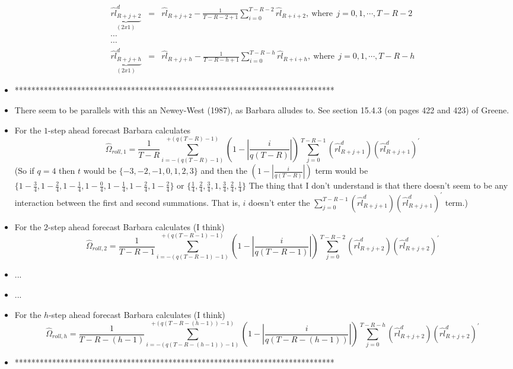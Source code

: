 \documentclass[11pt]{article}
\begin{document}
\begin{itemize}
\begin{eqnarray}
\underbrace{\widehat{rl}^{d}_{R+j+2}}_{(2x1)}\!\!\!\!&=&\!\!\!\!\widehat{rl}_{R+j+2}-\frac{1}{T-R-2+1}\sum_{i=0}^{T-R-2}\widehat{rl}_{R+i+2}, \ \textrm{where} \ \ j=0, 1, \cdots, T-R-2\nonumber \\
\cdots
\nonumber \\
\cdots
\nonumber \\
\underbrace{\widehat{rl}^{d}_{R+j+h}}_{(2x1)}\!\!\!\!&=&\!\!\!\!\widehat{rl}_{R+j+h}-\frac{1}{T-R-h+1}\sum_{i=0}^{T-R-h}\widehat{rl}_{R+i+h}, \ \textrm{where} \ \ j=0, 1, \cdots, T-R-h
\nonumber
\end{eqnarray}
\item *****************************************************************************
\item There seem to be parallels with this an Newey-West (1987), as Barbara alludes to.  See section 15.4.3 (on pages 422 and 423) of Greene. 
\item For the $1$-step ahead forecast Barbara calculates
\[ \widehat{\Omega}_{roll,1}=\frac{1}{T-R}\sum_{i=-(q(T-R)-1)}^{+(q(T-R)-1)}\left(1-\left|\frac{i}{q(T-R)}\right|\right)\sum_{j=0}^{T-R-1}(\widehat{rl}^{d}_{R+j+1})(\widehat{rl}^{d}_{R+j+1})^{\prime}
\]
(So if $q=4$ then $t$ would be $\{-3,-2,-1,0,1,2,3\}$ and then the $\left(1-\left|\frac{i}{q(T-R)}\right|\right)$ term would be $\{1-\frac{3}{4},1-\frac{2}{4},1-\frac{1}{4},1-\frac{0}{4},1-\frac{1}{4},1-\frac{2}{4},1-\frac{2}{4}\}$ or $\{\frac{1}{4},\frac{2}{4},\frac{3}{4},1,\frac{3}{4},\frac{2}{4},\frac{1}{4}\}$  The thing that I don't understand is that there doesn't seem to be any interaction between the first and second summations.  That is, $i$ doesn't enter the $\sum_{j=0}^{T-R-1}(\widehat{rl}^{d}_{R+j+1})(\widehat{rl}^{d}_{R+j+1})^{\prime}$ term.) 
\item For the $2$-step ahead forecast Barbara calculates (I think)
\[ \widehat{\Omega}_{roll,2}=\frac{1}{T-R-1}\sum_{i=-(q(T-R-1)-1)}^{+(q(T-R-1)-1)}\left(1-\left|\frac{i}{q(T-R-1)}\right|\right)\sum_{j=0}^{T-R-2}(\widehat{rl}^{d}_{R+j+2})(\widehat{rl}^{d}_{R+j+2})^{\prime}
\]
\item ...
\item ...
\item For the $h$-step ahead forecast Barbara calculates (I think)
\[ \widehat{\Omega}_{roll,h}=\!\!  \frac{1}{T\!-\!R\!-\!(h\!-\!1)}\!\!\sum_{i=-(q(T-R-(h-1))-1)}^{+(q(T-R-(h-1))-1)}\!\!\left(1\!-\!\left|\frac{i}{q(T\!-\!R\!-\!(h\!-\!1))}\right|\right)\!\!\sum_{j=0}^{T-R-h}\!\!\!(\widehat{rl}^{d}_{R+j+2})(\widehat{rl}^{d}_{R+j+2})^{\prime}
\]
\item *****************************************************************************

\end{itemize}
\end{document}
